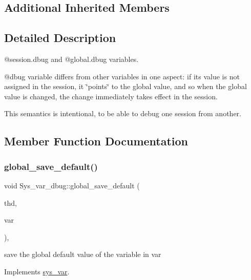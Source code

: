 \subsection*{Additional Inherited Members}


\subsection{Detailed Description}
@session.\+dbug and @global.\+dbug variables.

@dbug variable differs from other variables in one aspect\+: if its value is not assigned in the session, it \char`\"{}points\char`\"{} to the global value, and so when the global value is changed, the change immediately takes effect in the session.

This semantics is intentional, to be able to debug one session from another. 

\subsection{Member Function Documentation}
\mbox{\label{classSys__var__dbug_a022ff27659567b4ed8b73f797f0d51bb}} 
\subsubsection{\texorpdfstring{global\+\_\+save\+\_\+default()}{global\_save\_default()}}
{\footnotesize\ttfamily void Sys\+\_\+var\+\_\+dbug\+::global\+\_\+save\+\_\+default (\begin{DoxyParamCaption}\item[{T\+HD $\ast$}]{thd,  }\item[{\mbox{\hyperlink{classset__var}{set\+\_\+var}} $\ast$}]{var }\end{DoxyParamCaption})\hspace{0.3cm}{\ttfamily [inline]}, {\ttfamily [virtual]}}

save the global default value of the variable in var 

Implements \mbox{\hyperlink{classsys__var}{sys\+\_\+var}}.

\mbox{\label{classSys__var__dbug_a6a5b393d2e8fd791ca0d567de63cf995}} 
